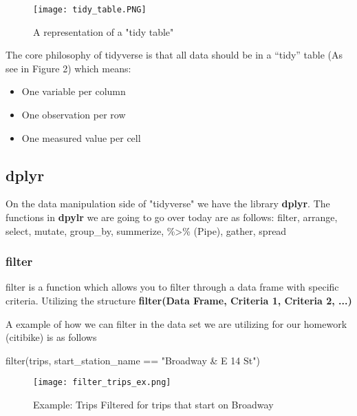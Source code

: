 \begin{figure}[H]
    \centering
    \texttt{[image: tidy\_table.PNG]}
    \caption{A representation of a "tidy table"}
    \label{fig:tidy_table}
\end{figure}

\begin{flushleft}

The core philosophy of tidyverse is that all data should be in a “tidy” table (As see in Figure 2) which means:
\begin{itemize}
    \item One variable per column
    \item One observation per row
    \item One measured value per cell
\end{itemize}
\end{flushleft}


\subsection{dplyr}

\begin{flushleft}
On the data manipulation side of "tidyverse" we have the library \textbf{dplyr}. The functions in \textbf{dpylr} we are going to go over today are as follows: filter, arrange, select, mutate, group\_by, summerize, \%\textgreater\% (Pipe), gather, spread
\end{flushleft}

\subsubsection{filter}
\begin{flushleft}
filter is a function which allows you to filter through a data frame with specific criteria. Utilizing the structure 
\textbf{filter(Data Frame, Criteria 1, Criteria 2, ...)}
\end{flushleft}

\begin{flushleft}
A example of how we can filter in the data set we are utilizing for our homework (citibike) is as follows
\end{flushleft}
\begin{center}
filter(trips, start\_station\_name == "Broadway \& E 14 St")
\end{center}

\begin{figure}[H]
    \centering
    \texttt{[image: filter\_trips\_ex.png]}
    \caption{Example: Trips Filtered for trips that start on Broadway}
    \label{fig:filter_trips_ex}
\end{figure}

